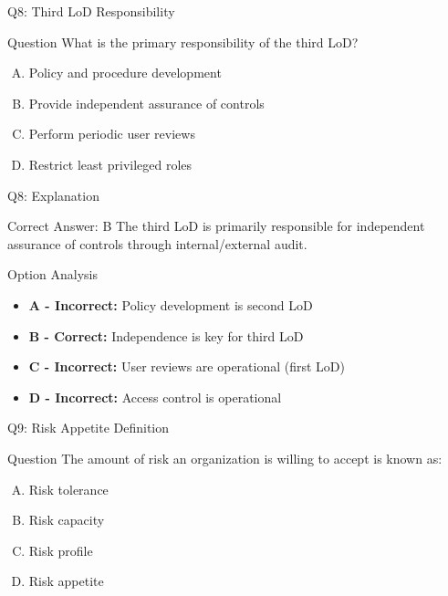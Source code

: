 \documentclass{beamer}
\begin{document}
	\begin{frame}{Q8: Third LoD Responsibility}
		\begin{block}{Question}
			What is the primary responsibility of the third LoD?
		\end{block}
		\begin{enumerate}[(A)]
			\item Policy and procedure development
			\item Provide independent assurance of controls
			\item Perform periodic user reviews
			\item Restrict least privileged roles
		\end{enumerate}
	\end{frame}
	
	\begin{frame}{Q8: Explanation}
		\begin{block}{Correct Answer: B}
			The third LoD is primarily responsible for independent assurance of controls through internal/external audit.
		\end{block}
		\begin{block}{Option Analysis}
			\begin{itemize}
				\item \textbf{A - Incorrect:} Policy development is second LoD
				\item \textbf{B - Correct:} Independence is key for third LoD
				\item \textbf{C - Incorrect:} User reviews are operational (first LoD)
				\item \textbf{D - Incorrect:} Access control is operational
			\end{itemize}
		\end{block}
	\end{frame}
	
	\begin{frame}{Q9: Risk Appetite Definition}
		\begin{block}{Question}
			The amount of risk an organization is willing to accept is known as:
		\end{block}
		\begin{enumerate}[(A)]
			\item Risk tolerance
			\item Risk capacity
			\item Risk profile
			\item Risk appetite
		\end{enumerate}
	\end{frame}
	
\end{document}
